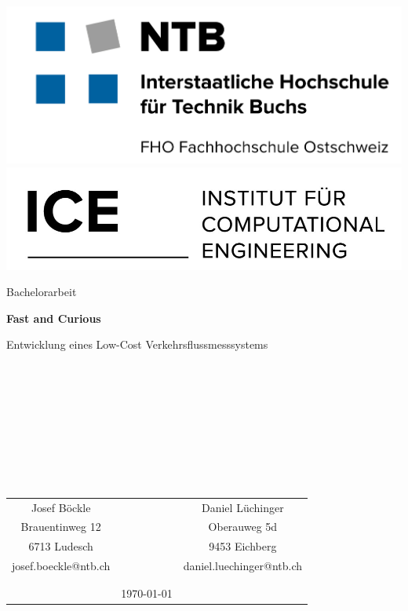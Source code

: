 \begin{titlepage}
	\includegraphics[height=0.05\textheight]{Deckblatt/NTB.jpg}
	\hfill
  	\includegraphics[height=0.05\textheight]{Deckblatt/ICE.jpg}
  	
	\thispagestyle{empty} %
	
	\vspace{8cm}
	
	\centering
	
	
	\begin{huge} 
		Bachelorarbeit
	\end{huge}
	
	\vspace{2cm}

	\fontsize{45pt}{30pt}\selectfont
	\textbf{Fast and Curious }

	

	\vspace{1cm}
	
	\fontsize{20pt}{20pt}\selectfont	
	Entwicklung eines Low-Cost Verkehrsflussmesssystems 
	\fontsize{11pt}{11pt}\selectfont	

\begin{verbatim}









\end{verbatim}

\begin{center}
  \begin{tabular}[p{3cm}p{10cm}p{3cm}]{ccc}
  \\
	Josef Böckle      & & Daniel Lüchinger \\[1.2ex]
	Brauentinweg 12  & & Oberauweg 5d \\[1.2ex]
	6713 Ludesch 	   & & 9453 Eichberg \\ [1.2ex]
	josef.boeckle@ntb.ch   & & daniel.luechinger@ntb.ch\\\\\\ [1.2ex]
	& \large{\today} &
  \end{tabular}


\end{center}
\end{titlepage}
